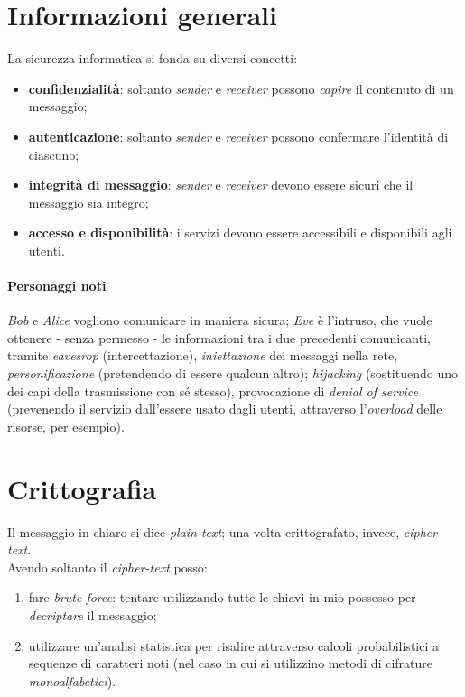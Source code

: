 \section{Informazioni generali}
La sicurezza informatica si fonda su diversi concetti:
\begin{itemize}
	\item \textbf{confidenzialità}: soltanto \textit{sender} e \textit{receiver} possono \textit{capire} il contenuto di un messaggio;
	\item \textbf{autenticazione}: soltanto \textit{sender} e \textit{receiver} possono confermare l'identità di ciascuno;
	\item \textbf{integrità di messaggio}: \textit{sender} e \textit{receiver} devono essere sicuri che il messaggio sia integro;
	\item \textbf{accesso e disponibilità}: i servizi devono essere accessibili e disponibili agli utenti.
\end{itemize}

\paragraph{Personaggi noti}
\textit{Bob} e \textit{Alice} vogliono comunicare in maniera sicura; \textit{Eve} è l'intruso, che vuole ottenere - senza permesso - le informazioni tra i due precedenti comunicanti, tramite \textit{eavesrop} (intercettazione), \textit{iniettazione} dei messaggi nella rete, \textit{personificazione} (pretendendo di essere qualcun altro); \textit{hijacking} (sostituendo uno dei capi della trasmissione con sé stesso), provocazione di \textit{denial of service} (prevenendo il servizio dall'essere usato dagli utenti, attraverso l'\textit{overload} delle risorse, per esempio).
\newpage

\section{Crittografia}
Il messaggio in chiaro si dice \textit{plain-text}; una volta crittografato, invece, \textit{cipher-text}. \\
Avendo soltanto il \textit{cipher-text} posso:
\begin{enumerate}
	\item fare \textit{brute-force}: tentare utilizzando tutte le chiavi in mio possesso per \textit{decriptare} il messaggio;
	\item utilizzare un'analisi statistica per risalire attraverso calcoli probabilistici a sequenze di caratteri noti (nel caso in cui si utilizzino metodi di cifrature \textit{monoalfabetici}).
\end{enumerate}

